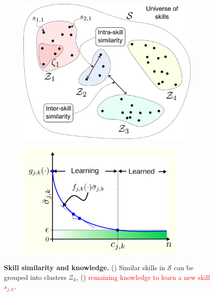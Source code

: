 \documentclass[12pt]{article}
\newcommand\myhl[1]{\textcolor{red}{#1}}
\begin{document}
\begin{figure}[!t]
	\centering
	\hspace*{\fill}
	\begin{subfigure}[t]{0.45\textwidth}
		\subcaption{}
		\includegraphics[width= \textwidth]{skill_similarity.png} \label{fig:skill_similarity}
	\end{subfigure}
	\hfill
	\begin{subfigure}[t]{8.35cm}	
		\subcaption{}
		\includegraphics[width=8.35cm]{remaining_knowledge_dynamics_idealization.png} \label{fig:knowledge_idealization}
	\end{subfigure}
	\hspace*{\fill}
	\caption[] {\label{fig:experimental_results} \textbf{Skill similarity and knowledge.} () Similar skills in $\mathcal{S}$ can be grouped into clusters $\mathcal{Z}_k$, () \myhl{remaining knowledge to learn a new skill $s_{j,k}$}.}	
\end{figure}
\end{document}
